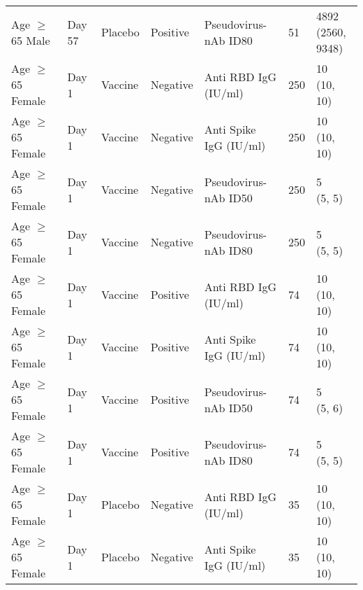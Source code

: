 \documentclass[]{book}
\theoremstyle{definition}
\theoremstyle{definition}
\theoremstyle{definition}
\newcommand{\1}{\mathbbm{1}}
\begin{document}
\begin{landscape}
\begin{ThreePartTable}
\begin{longtable}[t]{>{\raggedright\arraybackslash}p{7cm}llllll}
\hspace{1em}Age $\geq$ 65 Male & Day 57 & Placebo & Positive & Pseudovirus-nAb ID80 & 51 & \makecell[l]{4892\\(2560, 9348)}\\
\hspace{1em}Age $\geq$ 65 Female & Day 1 & Vaccine & Negative & Anti RBD IgG (IU/ml) & 250 & \makecell[l]{10\\(10, 10)}\\
\hspace{1em}Age $\geq$ 65 Female & Day 1 & Vaccine & Negative & Anti Spike IgG (IU/ml) & 250 & \makecell[l]{10\\(10, 10)}\\
\hspace{1em}Age $\geq$ 65 Female & Day 1 & Vaccine & Negative & Pseudovirus-nAb ID50 & 250 & \makecell[l]{5\\(5, 5)}\\
\hspace{1em}Age $\geq$ 65 Female & Day 1 & Vaccine & Negative & Pseudovirus-nAb ID80 & 250 & \makecell[l]{5\\(5, 5)}\\
\hspace{1em}Age $\geq$ 65 Female & Day 1 & Vaccine & Positive & Anti RBD IgG (IU/ml) & 74 & \makecell[l]{10\\(10, 10)}\\
\hspace{1em}Age $\geq$ 65 Female & Day 1 & Vaccine & Positive & Anti Spike IgG (IU/ml) & 74 & \makecell[l]{10\\(10, 10)}\\
\hspace{1em}Age $\geq$ 65 Female & Day 1 & Vaccine & Positive & Pseudovirus-nAb ID50 & 74 & \makecell[l]{5\\(5, 6)}\\
\hspace{1em}Age $\geq$ 65 Female & Day 1 & Vaccine & Positive & Pseudovirus-nAb ID80 & 74 & \makecell[l]{5\\(5, 5)}\\
\hspace{1em}Age $\geq$ 65 Female & Day 1 & Placebo & Negative & Anti RBD IgG (IU/ml) & 35 & \makecell[l]{10\\(10, 10)}\\
\hspace{1em}Age $\geq$ 65 Female & Day 1 & Placebo & Negative & Anti Spike IgG (IU/ml) & 35 & \makecell[l]{10\\(10, 10)}\\

\end{longtable}
\end{ThreePartTable}
\end{landscape}
\end{document}
